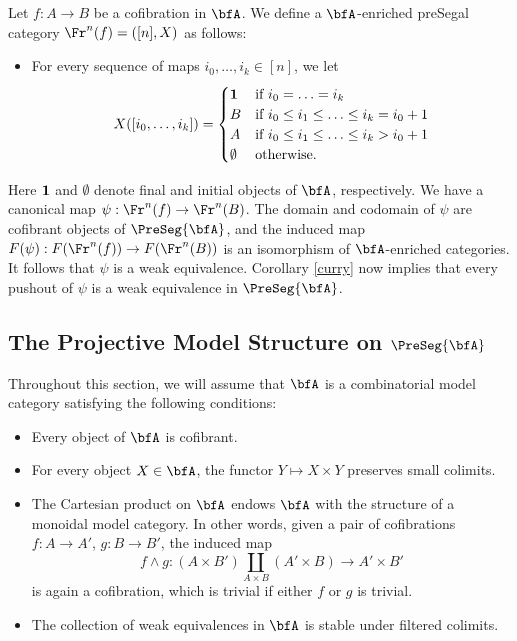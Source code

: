 \begin{example}\label{swaggius}
Let $f: A \rightarrow B$ be a cofibration in $\bfA$. We define a $\bfA$-enriched preSegal category
$\Fr^{n}(f)=([n], X)$ as follows:
\begin{itemize}
\item For every sequence of maps $i_0, \ldots, i_k \in [n]$, we let
$$X( [i_0, \ldots, i_k]) = \begin{cases} {\bf 1} & \text{if } i_0 = \ldots = i_k \\
B & \text{if } i_0 \leq i_1 \leq \ldots \leq i_k = i_0 + 1 \\
A & \text{if } i_0 \leq i_1 \leq \ldots \leq i_k > i_0 +1 \\
\emptyset & \text{otherwise.} \end{cases}$$
\end{itemize}
Here ${\bf 1}$ and $\emptyset$ denote final and initial objects of $\bfA$, respectively.
We have a canonical map $\psi: \Fr^{n}(f) \rightarrow \Fr^n(B)$. The domain and codomain of $\psi$ are cofibrant objects of $\PreSeg{\bfA}$, and the induced map $F(\psi): F( \Fr^{n}(f) ) \rightarrow F( \Fr^{n}(B))$ is an isomorphism of $\bfA$-enriched categories. It follows that $\psi$ is a weak equivalence.
Corollary \ref{curry} now implies that every pushout of $\psi$ is a weak equivalence in
$\PreSeg{\bfA}$.
\end{example}


\subsection{The Projective Model Structure on \texorpdfstring{$\PreSeg{\bfA}$}{PreSeg\_A}}\label{bisec2.2}

Throughout this section, we will assume that $\bfA$ is a combinatorial model category
satisfying the following conditions:
\begin{itemize}
\item[$(A1)$] Every object of $\bfA$ is cofibrant.
\item[$(A2)$] For every object $X \in \bfA$, the functor $Y \mapsto X \times Y$ preserves small colimits.
\item[$(A3)$] The Cartesian product on $\bfA$ endows $\bfA$ with the structure of a monoidal model category. In other words, given a pair of cofibrations $f: A \rightarrow A'$, $g: B \rightarrow B'$, the induced map
$$ f \wedge g: (A \times B') \coprod_{ A \times B} (A' \times B) \rightarrow A' \times B'$$
is again a cofibration, which is trivial if either $f$ or $g$ is trivial.
\item[$(A4)$] The collection of weak equivalences in $\bfA$ is stable under filtered colimits.
\end{itemize}

